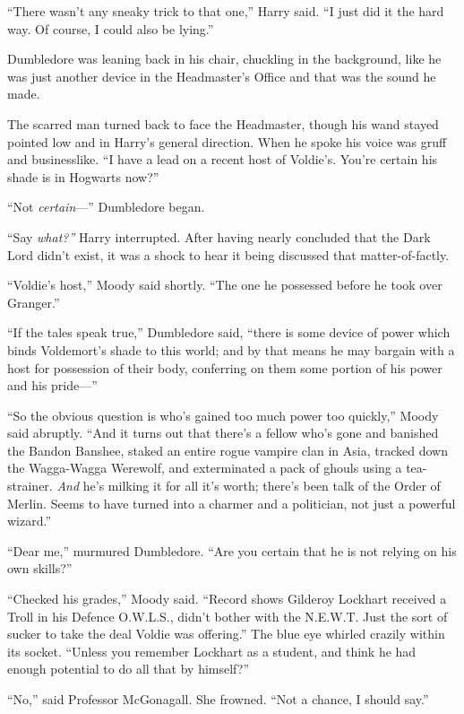 ``There wasn't any sneaky trick to that one,'' Harry said. ``I just did
it the hard way. Of course, I could also be lying.''

Dumbledore was leaning back in his chair, chuckling in the background,
like he was just another device in the Headmaster's Office and that was
the sound he made.

The scarred man turned back to face the Headmaster, though his wand
stayed pointed low and in Harry's general direction. When he spoke his
voice was gruff and businesslike. ``I have a lead on a recent host of
Voldie's. You're certain his shade is in Hogwarts now?''

``Not \emph{certain}---'' Dumbledore began.

``Say \emph{what?''} Harry interrupted. After having nearly concluded
that the Dark Lord didn't exist, it was a shock to hear it being
discussed that matter-of-factly.

``Voldie's host,'' Moody said shortly. ``The one he possessed before he
took over Granger.''

``If the tales speak true,'' Dumbledore said, ``there is some device of
power which binds Voldemort's shade to this world; and by that means he
may bargain with a host for possession of their body, conferring on them
some portion of his power and his pride---''

``So the obvious question is who's gained too much power too quickly,''
Moody said abruptly. ``And it turns out that there's a fellow who's gone
and banished the Bandon Banshee, staked an entire rogue vampire clan in
Asia, tracked down the Wagga-Wagga Werewolf, and exterminated a pack of
ghouls using a tea-strainer. \emph{And} he's milking it for all it's
worth; there's been talk of the Order of Merlin. Seems to have turned
into a charmer and a politician, not just a powerful wizard.''

``Dear me,'' murmured Dumbledore. ``Are you certain that he is not
relying on his own skills?''

``Checked his grades,'' Moody said. ``Record shows Gilderoy Lockhart
received a Troll in his Defence O.W.L.S., didn't bother with the
N.E.W.T. Just the sort of sucker to take the deal Voldie was offering.''
The blue eye whirled crazily within its socket. ``Unless you remember
Lockhart as a student, and think he had enough potential to do all that
by himself?''

``No,'' said Professor McGonagall. She frowned. ``Not a chance, I should
say.''

